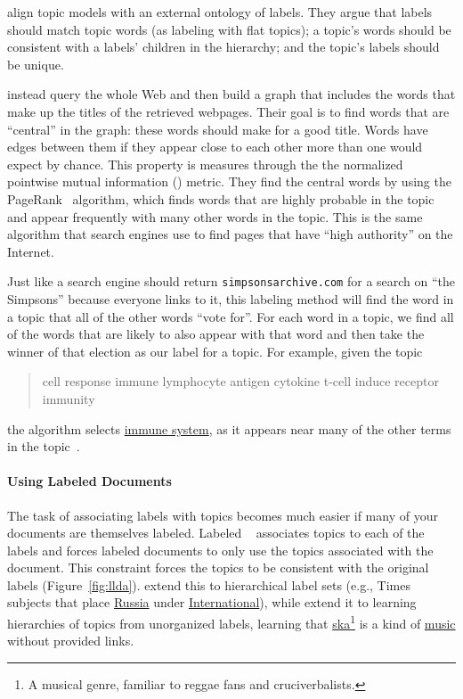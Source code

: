 \citet{mao-12} align topic models with an external ontology of labels.
They argue that labels should match topic words (as labeling with flat
topics); a topic's words should be consistent with a labels' children
in the hierarchy; and the topic's labels should be unique.

\citet{aleteras-14} instead query the whole Web and then build a graph that
includes the words that make up the titles of the retrieved webpages. 
Their goal is to find words that are ``central'' in the graph: these
words should make for a good title.
Words have edges between them if they appear close to each other more
than one would expect by chance.
This property is measures through the  the normalized pointwise mutual
information () metric.
They find the central words by using the PageRank~\citep{page-99}
algorithm, which finds words that are highly probable in the topic and appear frequently
with many other words in the topic.
This is the same algorithm that search engines use to find pages that
have ``high authority'' on the Internet.

Just like a search engine should return \texttt{simpsonsarchive.com}
for a search on ``the Simpsons'' because everyone links to it, this
labeling method will find the word in a topic that all of the other
words ``vote for''.  
For each word in a topic, we find all of the
words that are likely to also appear with that word and then take the
winner of that election as our label for a topic.  For example, given
the topic
\begin{quote}
cell response immune lymphocyte antigen cytokine t-cell induce
receptor immunity
\end{quote}
the algorithm selects \underline{immune system}, as it appears near many of
the other terms in the topic~\citep{aleteras-14}.

\paragraph{Using Labeled Documents}

The task of associating labels with topics becomes much easier if many of your
documents are themselves labeled.  Labeled ~\citep{ramage-09}
associates topics to each of the labels and forces labeled documents to only use
the topics associated with the document.  This constraint forces the topics to
be consistent with the original labels (Figure~\ref{fig:llda}).
\citet{Bakalov-12} extend this to hierarchical label sets (e.g.,  Times
subjects that place \underline{Russia} under \underline{International}), while
\citet{nguyen:boyd-graber:resnik:chang-2014} extend it to learning hierarchies
of topics from unorganized labels, learning that \underline{ska}\footnote{A musical genre, familiar to reggae fans and cruciverbalists.} is a
kind of \underline{music} without provided links.


